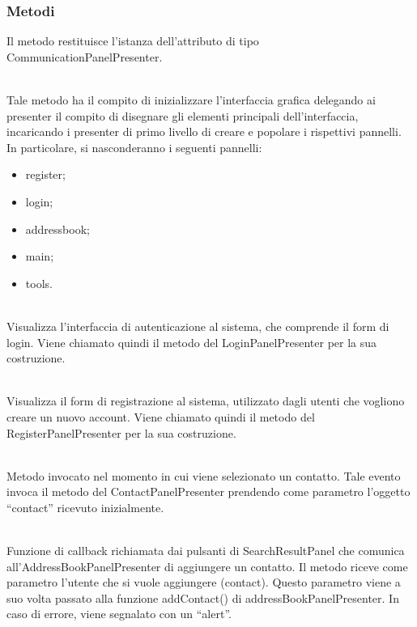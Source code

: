 \subsubsection*{Metodi}
\begin{description}
\item{}
Il metodo restituisce l'istanza dell'attributo di tipo  CommunicationPanelPresenter.

\item{}\\
Tale metodo ha il compito di inizializzare l'interfaccia grafica delegando ai presenter il compito di disegnare gli elementi principali dell'interfaccia, incaricando i presenter di primo livello di creare e popolare i rispettivi pannelli. In particolare, si nasconderanno i seguenti pannelli:
\begin{itemize}
\item register;
\item login;
\item addressbook;
\item main;
\item tools.
\end{itemize}


\item{}\\
Visualizza l'interfaccia di autenticazione al sistema, che comprende il form di login. Viene chiamato quindi il metodo  del LoginPanelPresenter per la sua costruzione.
	
\item{}\\
Visualizza il form di registrazione al sistema, utilizzato dagli utenti che vogliono creare un nuovo account. Viene chiamato quindi il metodo  del RegisterPanelPresenter per la sua costruzione.

\item{}\\
Metodo invocato nel momento in cui viene selezionato un contatto. Tale evento invoca il metodo  del ContactPanelPresenter prendendo come parametro l'oggetto ``contact'' ricevuto inizialmente. 


\item{}\\
Funzione di callback richiamata dai pulsanti di SearchResultPanel che comunica all'AddressBookPanelPresenter di aggiungere un contatto. Il metodo riceve come parametro l'utente che si vuole aggiungere (contact). Questo parametro viene a suo volta passato alla funzione addContact() di addressBookPanelPresenter. In caso di errore, viene segnalato con un ``alert''.


\end{description}
